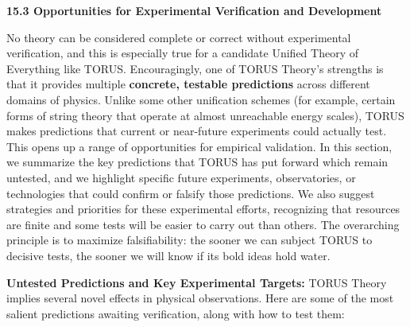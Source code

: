 \documentclass[
]{article}
\begin{document}
\textbf{15.3 Opportunities for Experimental Verification and
Development}

No theory can be considered complete or correct without experimental
verification, and this is especially true for a candidate Unified Theory
of Everything like TORUS. Encouragingly, one of TORUS Theory's strengths
is that it provides multiple \textbf{concrete, testable predictions}
across different domains of physics. Unlike some other unification
schemes (for example, certain forms of string theory that operate at
almost unreachable energy scales), TORUS makes predictions that current
or near-future experiments could actually test\hspace{0pt}. This opens
up a range of opportunities for empirical validation. In this section,
we summarize the key predictions that TORUS has put forward which remain
untested, and we highlight specific future experiments, observatories,
or technologies that could confirm or falsify those predictions. We also
suggest strategies and priorities for these experimental efforts,
recognizing that resources are finite and some tests will be easier to
carry out than others. The overarching principle is to maximize
falsifiability: the sooner we can subject TORUS to decisive tests, the
sooner we will know if its bold ideas hold water.

\textbf{Untested Predictions and Key Experimental Targets:} TORUS Theory
implies several novel effects in physical observations. Here are some of
the most salient predictions awaiting verification, along with how to
test them:
\end{document}
